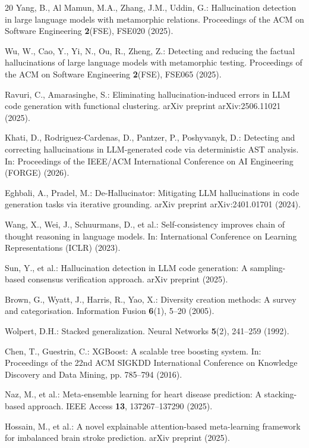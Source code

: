 \documentclass{svproc}
\begin{document}
\begin{thebibliography}{20}
Yang, B., Al Mamun, M.A., Zhang, J.M., Uddin, G.: Hallucination detection in large language models with metamorphic relations. Proceedings of the ACM on Software Engineering \textbf{2}(FSE), FSE020 (2025).

Wu, W., Cao, Y., Yi, N., Ou, R., Zheng, Z.: Detecting and reducing the factual hallucinations of large language models with metamorphic testing. Proceedings of the ACM on Software Engineering \textbf{2}(FSE), FSE065 (2025).

Ravuri, C., Amarasinghe, S.: Eliminating hallucination-induced errors in LLM code generation with functional clustering. arXiv preprint arXiv:2506.11021 (2025).

Khati, D., Rodriguez-Cardenas, D., Pantzer, P., Poshyvanyk, D.: Detecting and correcting hallucinations in LLM-generated code via deterministic AST analysis. In: Proceedings of the IEEE/ACM International Conference on AI Engineering (FORGE) (2026).

Eghbali, A., Pradel, M.: De-Hallucinator: Mitigating LLM hallucinations in code generation tasks via iterative grounding. arXiv preprint arXiv:2401.01701 (2024).

Wang, X., Wei, J., Schuurmans, D., et al.: Self-consistency improves chain of thought reasoning in language models. In: International Conference on Learning Representations (ICLR) (2023).

Sun, Y., et al.: Hallucination detection in LLM code generation: A sampling-based consensus verification approach. arXiv preprint (2025).

Brown, G., Wyatt, J., Harris, R., Yao, X.: Diversity creation methods: A survey and categorisation. Information Fusion \textbf{6}(1), 5--20 (2005).

Wolpert, D.H.: Stacked generalization. Neural Networks \textbf{5}(2), 241--259 (1992).

Chen, T., Guestrin, C.: XGBoost: A scalable tree boosting system. In: Proceedings of the 22nd ACM SIGKDD International Conference on Knowledge Discovery and Data Mining, pp. 785--794 (2016).

Naz, M., et al.: Meta-ensemble learning for heart disease prediction: A stacking-based approach. IEEE Access \textbf{13}, 137267--137290 (2025).

Hossain, M., et al.: A novel explainable attention-based meta-learning framework for imbalanced brain stroke prediction. arXiv preprint (2025).

\end{thebibliography}
\end{document}
